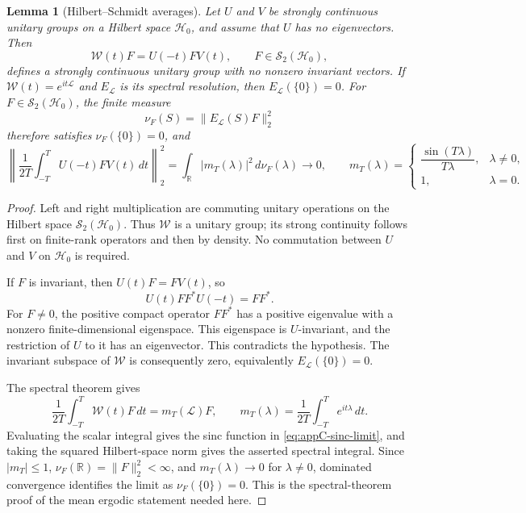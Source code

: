 \documentclass[a4paper,11pt]{article}
\newtheorem{lemma}[theorem]{Lemma}
\theoremstyle{definition}
\begin{document}
\begin{lemma}[Hilbert--Schmidt averages]\label{lem:appC-HS-averages}
Let $U$ and $V$ be strongly continuous unitary groups on a Hilbert space $\mathcal H_0$, and assume that $U$ has no eigenvectors. Then
\[
 \mathcal W(t)F=U(-t)FV(t),\qquad F\in\mathcal S_2(\mathcal H_0),
\]
defines a strongly continuous unitary group with no nonzero invariant vectors. If $\mathcal W(t)=e^{it\mathcal L}$ and $E_{\mathcal L}$ is its spectral resolution, then $E_{\mathcal L}(\{0\})=0$. For $F\in\mathcal S_2(\mathcal H_0)$, the finite measure
\begin{equation}
 \nu_F(S)=\|E_{\mathcal L}(S)F\|_2^2
 \label{eq:appC-HS-measure}
\end{equation}
therefore satisfies $\nu_F(\{0\})=0$, and
\begin{equation}
 \left\|\frac1{2T}\int_{-T}^{T}U(-t)FV(t)\,dt\right\|_2^2
 =\int_{\mathbb R}|m_T(\lambda)|^2\,d\nu_F(\lambda)
 \longrightarrow0,\qquad
 m_T(\lambda)=
 \begin{cases}
 \dfrac{\sin(T\lambda)}{T\lambda},&\lambda\ne0,\\
 1,&\lambda=0.
 \end{cases}
 \label{eq:appC-sinc-limit}
\end{equation}
\end{lemma}

\begin{proof}
Left and right multiplication are commuting unitary operations on the Hilbert space $\mathcal S_2(\mathcal H_0)$. Thus $\mathcal W$ is a unitary group; its strong continuity follows first on finite-rank operators and then by density. No commutation between $U$ and $V$ on $\mathcal H_0$ is required.

If $F$ is invariant, then $U(t)F=FV(t)$, so
\begin{equation}
 U(t)FF^*U(-t)=FF^* .
 \label{eq:appC-compact-intertwiner}
\end{equation}
For $F\ne0$, the positive compact operator $FF^*$ has a positive eigenvalue with a nonzero finite-dimensional eigenspace. This eigenspace is $U$-invariant, and the restriction of $U$ to it has an eigenvector. This contradicts the hypothesis. The invariant subspace of $\mathcal W$ is consequently zero, equivalently $E_{\mathcal L}(\{0\})=0$.

The spectral theorem gives
\[
 \frac1{2T}\int_{-T}^{T}\mathcal W(t)F\,dt=m_T(\mathcal L)F,
 \qquad
 m_T(\lambda)=\frac1{2T}\int_{-T}^{T}e^{it\lambda}\,dt .
\]
Evaluating the scalar integral gives the sinc function in \eqref{eq:appC-sinc-limit}, and taking the squared Hilbert-space norm gives the asserted spectral integral. Since $|m_T|\le1$, $\nu_F(\mathbb R)=\|F\|_2^2<\infty$, and $m_T(\lambda)\to0$ for $\lambda\ne0$, dominated convergence identifies the limit as $\nu_F(\{0\})=0$. This is the spectral-theorem proof of the mean ergodic statement needed here.
\end{proof}
\end{document}
